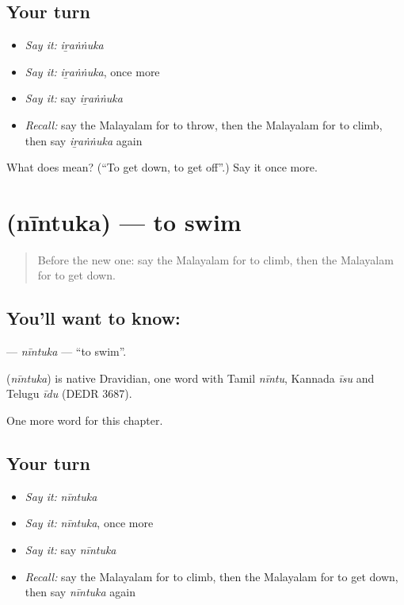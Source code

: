 \subsection*{Your turn}
\begin{itemize}
\raggedright
  \item \emph{Say it:} \emph{iṟaṅṅuka}
  \item \emph{Say it:} \emph{iṟaṅṅuka}, once more
  \item \emph{Say it:} say \emph{iṟaṅṅuka}
  \item \emph{Recall:} say the Malayalam for to throw, then the Malayalam for to climb, then say \emph{iṟaṅṅuka} again
\end{itemize}

\begin{tcolorbox}[breakable,colback=teal!4,colframe=teal!35!black,title={Before you move on}]
What does  mean? (\textquotedblleft{}To get down, to get off\textquotedblright{}.) Say it once more.
\end{tcolorbox}
\section[\texorpdfstring{\ml{നീന്തുക} (nīntuka)}{നീന്തുക (nīntuka)}]{ (nīntuka) — to swim}

\label{lesson:ML-C176-nintuka}



\begin{quote}
Before the new one: say the Malayalam for to climb, then the Malayalam for to get down.
\end{quote}

\subsection*{You'll want to know: }
\textbf{} — \emph{nīntuka} — \textquotedblleft{}to swim\textquotedblright{}.

\begin{cousinweb}
\textbf{} (\emph{nīntuka}) is native Dravidian, one word with Tamil \emph{nīntu}, Kannada \emph{īsu} and Telugu \emph{īdu} (DEDR 3687).
\end{cousinweb}

\begin{grammarlens}[title={What you've built}]
One more word for this chapter.
\end{grammarlens}

\subsection*{Your turn}
\begin{itemize}
\raggedright
  \item \emph{Say it:} \emph{nīntuka}
  \item \emph{Say it:} \emph{nīntuka}, once more
  \item \emph{Say it:} say \emph{nīntuka}
  \item \emph{Recall:} say the Malayalam for to climb, then the Malayalam for to get down, then say \emph{nīntuka} again
\end{itemize}

